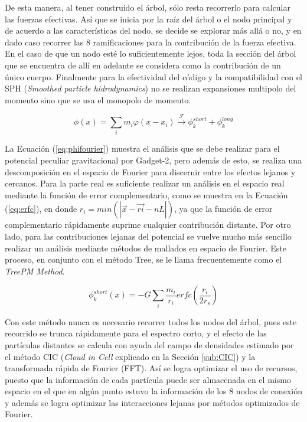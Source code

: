 De esta manera, al tener construido el árbol, sólo resta recorrerlo para calcular las fuerzas efectivas. Así que se inicia por la raíz del árbol o el nodo principal y de acuerdo a las características del nodo, se decide se explorar más allá o no, y en dado caso recorrer las 8 ramificaciones para la contribución de la fuerza efectiva. En el caso de que un nodo esté lo suficientemente lejos, toda la sección del árbol que se encuentra de allí en adelante se considera como la contribución de un único cuerpo. Finalmente para la efectividad del código y la compatibilidad con el SPH (\textit{Smoothed particle hidrodynamics}) no se realizan expansiones multipolo del momento sino que se usa el monopolo de momento. 

\begin{equation}
\phi(x)=\sum\limits_i m_i\varphi(x-x_i)\xrightarrow{\mathscr{F}}\phi^{short}_{k}+\phi^{long}_{k}
\label{eq:phifourier}
\end{equation}

La Ecuación (\ref{eq:phifourier}) muestra el análisis que se debe realizar para el potencial peculiar gravitacional por Gadget-2, pero además de esto, se realiza una descomposición en el espacio de Fourier para discernir entre los efectos lejanos y cercanos. Para la parte real es suficiente realizar un análisis en el espacio real mediante la función de error complementario, como se muestra en la Ecuación (\ref{eq:erfc}), en donde $r_i=min(|\vec{x}-\vec{ri}-nL|)$, ya que la función de error complementario rápidamente suprime cualquier contribución distante. Por otro lado, para las contribuciones lejanas del potencial se vuelve mucho más sencillo realizar un análisis mediante métodos de mallados en espacio de Fourier. Este proceso, en conjunto con el método Tree, se le llama frecuentemente como el \textit{TreePM Method}.

\begin{equation}
\phi^{short}_k(x)=-G\sum\limits_i\frac{m_i}{r_i}erfc\left(\frac{r_i}{2r_s}\right)
\label{eq:erfc}
\end{equation}

Con este método nunca es necesario recorrer todos los nodos del árbol, pues este recorrido se trunca rápidamente para el espectro corto, y el efecto de las partículas distantes se calcula con ayuda del campo de densidades estimado por el método CIC (\textit{Cloud in Cell} explicado en la Sección \ref{sub:CIC}) y la transformada rápida de Fourier (FFT). Así se logra optimizar el uso de recursos, puesto que la información de cada partícula puede ser almacenada en el mismo espacio en el que en algún punto estuvo la información de los 8 nodos de conexión y además se logra optimizar las interacciones lejanas por métodos optimizados de Fourier.

